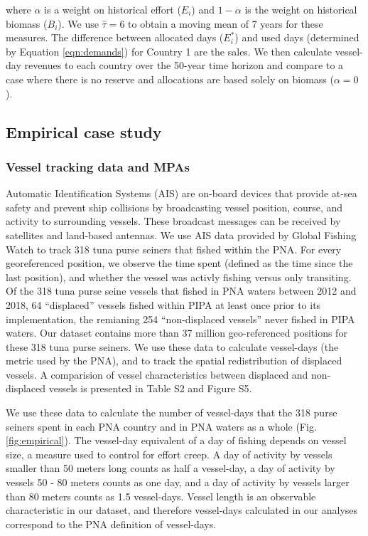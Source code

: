 \documentclass[12pt]{article}
\begin{document}
\noindent where $\alpha$ is a weight on historical effort ($E_i$) and $1-\alpha$ is the weight on historical biomass ($B_i$). We use $\hat{\tau}= 6$ to obtain a moving mean of 7 years for these measures. The difference between allocated days ($E_i^*$) and used days (determined by Equation \ref{eqn:demands}) for Country 1 are the sales. We then calculate vessel-day revenues to each country over the 50-year time horizon and compare to a case where there is no reserve and allocations are based solely on biomass ($\alpha = 0$).

\subsection{Empirical case study}

\subsubsection{Vessel tracking data and MPAs}

Automatic Identification Systems (AIS) are on-board devices that provide at-sea safety and prevent ship collisions by broadcasting vessel position, course, and activity to surrounding vessels. These broadcast messages can be received by satellites and land-based antennas. We use AIS data provided by Global Fishing Watch \cite{kroodsma_2018} to track 318 tuna purse seiners that fished within the PNA. For every georeferenced position, we observe the time spent (defined as the time since the last position), and whether the vessel was activly fishing versus only transiting. Of the 318 tuna purse seine vessels that fished in PNA waters between 2012 and 2018, 64 ``displaced'' vessels fished within PIPA at least once prior to its implementation, the remianing 254 ``non-displaced vessels'' never fished in PIPA waters. Our dataset contains more than 37 million geo-referenced positions for these 318 tuna purse seiners. We use these data to calculate vessel-days (the metric used by the PNA), and to track the spatial redistribution of displaced vessels. A comparision of vessel characteristics between displaced and non-displaced vessels is presented in Table S2 and Figure S5.

We use these data to calculate the number of vessel-days that the 318 purse seiners spent in each PNA country and in PNA waters as a whole (Fig. \ref{fig:empirical}). The vessel-day equivalent of a day of fishing depends on vessel size, a measure used to control for effort creep. A day of activity by vessels smaller than 50 meters long counts as half a vessel-day, a day of activity by vessels 50 - 80 meters counts as one day, and a day of activity by vessels larger than 80 meters counts as 1.5 vessel-days. Vessel length is an observable characteristic in our dataset, and therefore vessel-days calculated in our analyses correspond to the PNA definition of vessel-days.
\end{document}
